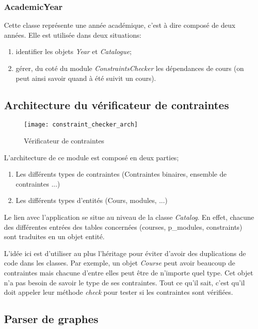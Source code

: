\subsubsection{AcademicYear}
Cette classe représente une année académique, c'est à dire composé de deux années. Elle est utilisée dans deux situations:
\begin{enumerate}
  \item identifier les objets \textit{Year} et \textit{Catalogue};
  \item gérer, du coté du module \textit{ConstraintsChecker} les dépendances de cours (on peut ainsi savoir quand à été suivit un cours). 
\end{enumerate}

\subsection{Architecture du vérificateur de contraintes}
\label{constraint_checker}
\begin{figure}[H]
\centering
\caption{Vérificateur de contraintes}
\label{fig:constraint_checker_arch}
\texttt{[image: constraint\_checker\_arch]}
\end{figure}

L'architecture de ce module est composé en deux parties;
\begin{enumerate}
  \item Les différents types de contraintes (Contraintes binaires, ensemble de contraintes ...)
  \item Les différents types d'entités (Cours, modules, ...)
\end{enumerate}

Le lien avec l'application se situe au niveau de la classe \textit{Catalog}. En effet, chacune des différentes entrées des tables concernées (courses, p\_modules, constraints) sont traduites en un objet entité.

L'idée ici est d'utiliser au plus l'héritage pour éviter d'avoir des duplications de code dans les classes. Par exemple, un objet \textit{Course} peut avoir beaucoup de contraintes mais chacune d’entre elles peut être de n'importe quel type. Cet objet n'a pas besoin de savoir le type de ses contraintes. Tout ce qu'il sait, c'est qu'il doit appeler leur méthode \textit{check} pour tester si les contraintes sont vérifiées. 


\subsection{Parser de graphes}

